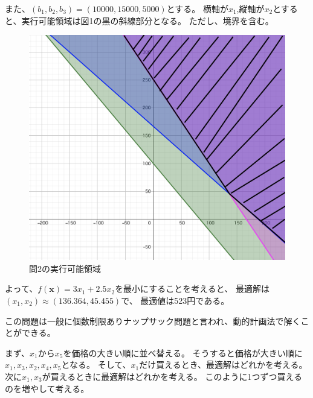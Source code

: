 \documentclass[12pt]{jarticle}
\begin{document}
また、$(b_1,b_2,b_3)=(10000,15000,5000)$とする。
横軸が$x_1$,縦軸が$x_2$とすると、実行可能領域は図1の黒の斜線部分となる。
ただし、境界を含む。
\begin{figure}[h]
    \begin{center}
        \includegraphics[scale=0.2]{kadai1_1.png}
    \end{center}
    \caption{問2の実行可能領域}
\end{figure}

よって、$f(\boldsymbol{x})=3x_1+2.5x_2$を最小にすることを考えると、
最適解は$(x_1,x_2)\approx (136.364,45.455)$で、
最適値は523円である。

\clearpage
{}
この問題は一般に個数制限ありナップサック問題と言われ、動的計画法で解くことができる。

まず、$x_1からx_5$を価格の大きい順に並べ替える。
そうすると価格が大きい順に$x_1,x_3,x_2,x_4,x_5$となる。
そして、$x_1$だけ買えるとき、最適解はどれかを考える。
次に$x_1,x_3$が買えるときに最適解はどれかを考える。
このように1つずつ買えるのを増やして考える。
\end{document}
